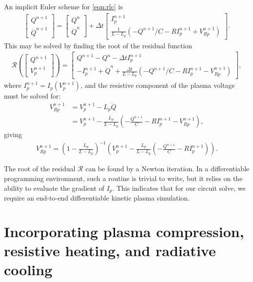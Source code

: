 \documentclass{article}
\begin{document}
An implicit Euler scheme for \eqref{eqn:rlc} is
\begin{align}
    \label{eqn:implicit_euler}
\begin{bmatrix}
    Q^{n+1} \\ \dot{Q}^{n+1}
\end{bmatrix}
=
\begin{bmatrix}
    Q^{n} \\ \dot{Q}^{n}
\end{bmatrix}
+
\Delta t
\begin{bmatrix}
    I_p^{n+1} \\
    \frac{1}{L - L_p} \left( -Q^{n+1} / C - R I_p^{n+1} + V_{Rp}^{n+1} \right) 
\end{bmatrix}.
\end{align}
This may be solved by finding the root of the residual function
\begin{align*}
\mathcal{R} \left( \begin{bmatrix}
        Q^{n+1} \\ V_p^{n+1}
\end{bmatrix} \right) 
=
\begin{bmatrix}
    Q^{n+1} - Q^n - \Delta t I_p^{n+1} \\
    -I_p^{n+1} + \dot{Q}^n + \frac{\Delta t}{L - L_p} \left( -Q^{n+1}/C - R I_p^{n+1} - V_{Rp}^{n+1} \right) 
\end{bmatrix},
\end{align*}
where $I_p^{n+1} = I_p(V_p^{n+1})$, and the resistive component of the plasma voltage must be solved for:
\begin{align*}
    V_{Rp}^{n+1} &= V_p^{n+1} - L_p \ddot{Q} \\
                 &= V_p^{n+1} - \frac{L_p}{L - L_p} \left( -\frac{Q^{n+1}}{C} - R I_p^{n+1} - V_{Rp}^{n+1} \right),
\end{align*}
giving
\begin{align*}
    V_{Rp}^{n+1} = \left( 1 - \frac{L_p}{L - L_p} \right)^{-1} \left( V_p^{n+1} - \frac{L_p}{L - L_p} \left( -\frac{Q^{n+1}}{C} - R I_p^{n+1} \right) \right).
\end{align*}

The root of the residual $\mathcal{R}$ can be found by a Newton iteration.
In a differentiable programming environment, such a routine is trivial to write,
but it relies on the ability to evaluate the gradient of $I_p$.
This indicates that for our circuit solve, we require an end-to-end differentiable 
kinetic plasma simulation.


\section{Incorporating plasma compression, resistive heating, and radiative cooling}
\end{document}

